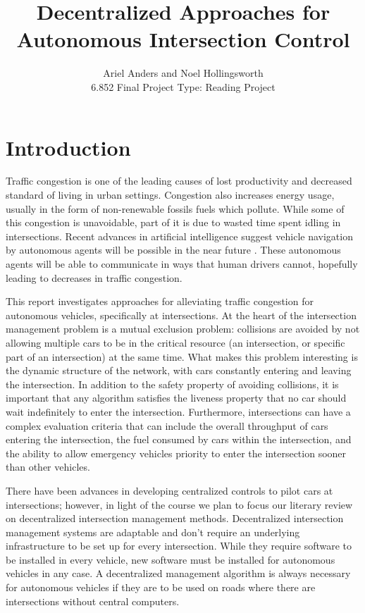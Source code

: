 \documentclass[12pt]{article}
\title{Decentralized Approaches for Autonomous Intersection Control }
\author{Ariel Anders and Noel Hollingsworth\\ 6.852 Final Project Type: Reading Project}
\begin{document}
\maketitle 

\pagebreak
\tableofcontents
\pagebreak

\section{Introduction}

Traffic congestion is one of the leading causes of lost productivity and decreased standard of living in urban settings. Congestion also increases energy usage, usually in the form of non-renewable fossils fuels which pollute. While some of this congestion is unavoidable, part of it is due to wasted time spent idling in intersections. Recent advances in artificial intelligence suggest vehicle navigation by autonomous agents will be possible in the near future \cite{dresner}. These autonomous agents will be able to communicate in ways that human drivers cannot, hopefully leading to decreases in traffic congestion.

This report investigates approaches for alleviating traffic congestion for autonomous vehicles, specifically at intersections. At the heart of the intersection management problem is a mutual exclusion problem: collisions are avoided by not allowing multiple cars to be in the critical resource (an intersection, or specific part of an intersection) at the same time.  What makes this problem interesting is the dynamic structure of the network, with cars constantly entering and leaving the intersection.  In addition to the safety property of avoiding collisions, it is important that any algorithm satisfies the liveness property that no car should wait indefinitely to enter the intersection.  Furthermore, intersections can have a complex evaluation criteria that can include the overall throughput of cars entering the intersection, the fuel consumed by cars within the intersection, and the ability to allow emergency vehicles priority to enter the intersection sooner than other vehicles. 

There have been advances in developing centralized controls to pilot cars at intersections; however, in light of the course we plan to focus our literary review on decentralized intersection management methods.  Decentralized intersection management systems are adaptable and don't require an underlying infrastructure to be set up for every intersection. While they require software to be installed in every vehicle, new software must be installed for autonomous vehicles in any case. A decentralized management algorithm is always necessary for autonomous vehicles if they are to be used on roads where there are intersections without central computers.
\end{document}

